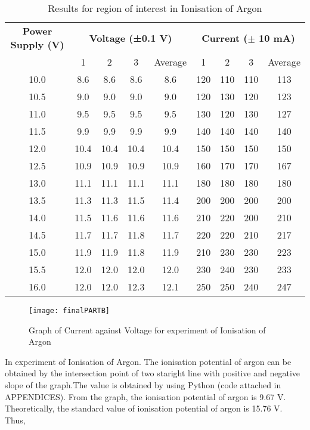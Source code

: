 \documentclass[a4paper,11pt]{article}
\begin{document}
\begin{table}[h!]
\small
\centering
\begin{tabular}{ccccccccc}
\toprule
\multicolumn{1}{c}{\textbf{Power Supply (V)}} & \multicolumn{4}{c}{\textbf{Voltage (±0.1 V)}} & \multicolumn{4}{c}{\textbf{Current ($\pm$ 10 mA)}} \\
\cmidrule(lr){2-5} \cmidrule(lr){6-9}
& 1 & 2 & 3 & Average & 1 & 2 & 3 & Average \\
\midrule
10.0 & 8.6 & 8.6 & 8.6 & 8.6 & 120 & 110 & 110 & 113 \\
10.5 & 9.0 & 9.0 & 9.0 & 9.0 & 120 & 130 & 120 & 123 \\
11.0 & 9.5 & 9.5 & 9.5 & 9.5 & 130 & 120 & 130 & 127 \\
11.5 & 9.9 & 9.9 & 9.9 & 9.9 & 140 & 140 & 140 & 140 \\
12.0 & 10.4 & 10.4 & 10.4 & 10.4 & 150 & 150 & 150 & 150 \\
12.5 & 10.9 & 10.9 & 10.9 & 10.9 & 160 & 170 & 170 & 167 \\
13.0 & 11.1 & 11.1 & 11.1 & 11.1 & 180 & 180 & 180 & 180 \\
13.5 & 11.3 & 11.3 & 11.5 & 11.4 & 200 & 200 & 200 & 200 \\
14.0 & 11.5 & 11.6 & 11.6 & 11.6 & 210 & 220 & 200 & 210 \\
14.5 & 11.7 & 11.7 & 11.8 & 11.7 & 220 & 220 & 210 & 217 \\
15.0 & 11.9 & 11.9 & 11.8 & 11.9 & 210 & 230 & 230 & 223 \\
15.5 & 12.0 & 12.0 & 12.0 & 12.0 & 230 & 240 & 230 & 233 \\
16.0 & 12.0 & 12.0 & 12.3 & 12.1 & 250 & 250 & 240 & 247 \\
\bottomrule
\end{tabular}
\caption{Results for region of interest in Ionisation of Argon}
\label{tab:measurements}
\end{table}

\begin{figure}[h!]
\centering
\texttt{[image: finalPARTB]}
\caption{Graph of Current against Voltage for experiment of Ionisation of Argon}
\label{3}
\end{figure}
\newpage 

In experiment of Ionisation of Argon. The ionisation potential of argon can be obtained by the intersection point of  two staright line with positive and negative slope of the graph.The value is obtained by using Python (code attached in APPENDICES).
From the graph, the ionisation potential of argon is 9.67 V.
Theoretically, the standard value of ionisation potential of argon is 15.76 V.
Thus,
\end{document}
